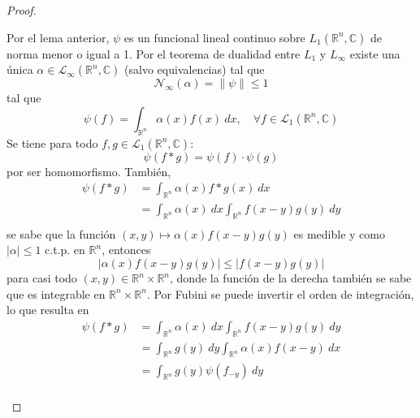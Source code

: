\documentclass[12pt]{report}
\theoremstyle{largebreak}
\renewcommand{\leq}{\ensuremath{\leqslant}}
\newcommand\abs[1]{\ensuremath{\left|#1\right|}}
\newcommand\norm[1]{\ensuremath{\|#1\|}}
\newcommand{\N}[2]{\ensuremath{\mathcal{N}_{#1}\left(#2\right)}}
\begin{document}
\begin{proof}
\begin{enumerate}
            Por el lema anterior, $\psi$ es un funcional lineal continuo sobre $L_1(\mathbb{R}^n,\mathbb{C})$ de norma menor o igual a 1. Por el teorema de dualidad entre $L_1$ y $L_{\infty}$ existe una única $\alpha\in\mathcal{L}_{\infty}(\mathbb{R}^n,\mathbb{C})$ (salvo equivalencias) tal que
            \begin{equation*}
                \N{\infty}{\alpha}=\norm{\psi}\leq1
            \end{equation*}
            tal que
            \begin{equation*}
                \psi(f)=\int_{\mathbb{R}^n}\alpha(x)f(x)\:dx,\quad\forall f\in\mathcal{L}_{1}(\mathbb{R}^n,\mathbb{C})
            \end{equation*}
            Se tiene para todo $f,g\in\mathcal{L}_{1}(\mathbb{R}^n,\mathbb{C})$:
            \begin{equation*}
                \psi(f*g)=\psi(f)\cdot\psi(g)
            \end{equation*}
            por ser homomorfismo. También,
            \begin{equation*}
                \begin{split}
                    \psi(f*g)&=\int_{\mathbb{R}^n}\alpha(x)f*g(x)\:dx\\
                    &=\int_{\mathbb{R}^n}\alpha(x)\:dx\int_{\mathbb{R}^n}f(x-y)g(y)\:dy\\
                \end{split}
            \end{equation*}
            se sabe que la función $(x,y)\mapsto\alpha(x)f(x-y)g(y)$ es medible y como $\abs{\alpha}\leq1$ c.t.p. en $\mathbb{R}^n$, entonces
            \begin{equation*}
                \abs{\alpha(x)f(x-y)g(y)}\leq\abs{f(x-y)g(y)}
            \end{equation*}
            para casi todo $(x,y)\in\mathbb{R}^n\times\mathbb{R}^n$, donde la función de la derecha también se sabe que es integrable en $\mathbb{R}^n\times\mathbb{R}^n$. Por Fubini se puede invertir el orden de integración, lo que resulta en
            \begin{equation*}
                \begin{split}
                    \psi(f*g)&=\int_{\mathbb{R}^n}\alpha(x)\:dx\int_{\mathbb{R}^n}f(x-y)g(y)\:dy\\
                    &=\int_{\mathbb{R}^n}g(y)\:dy\int_{\mathbb{R}^n}\alpha(x)f(x-y)\:dx\\
                    &=\int_{\mathbb{R}^n} g(y)\psi(f_{ -y})\:dy\\

\end{split}
\end{equation*}
\end{enumerate}
\end{proof}
\end{document}
